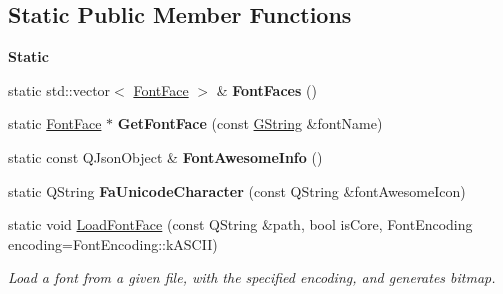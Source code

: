 \subsection*{Static Public Member Functions}
\begin{Indent}\textbf{ Static}\par
\begin{DoxyCompactItemize}
\item 
\mbox{\label{classrev_1_1_font_manager_a368b940b9ad9756a10a5d0de9022c65b}} 
static std\+::vector$<$ \mbox{\hyperlink{classrev_1_1_font_face}{Font\+Face}} $>$ \& {\bfseries Font\+Faces} ()
\item 
\mbox{\label{classrev_1_1_font_manager_a8752a2da7c737a473d25b6d7a15887e6}} 
static \mbox{\hyperlink{classrev_1_1_font_face}{Font\+Face}} $\ast$ {\bfseries Get\+Font\+Face} (const \mbox{\hyperlink{classrev_1_1_g_string}{G\+String}} \&font\+Name)
\item 
\mbox{\label{classrev_1_1_font_manager_a74da1f046298ddf7af77e0f4dc8f1d87}} 
static const Q\+Json\+Object \& {\bfseries Font\+Awesome\+Info} ()
\item 
\mbox{\label{classrev_1_1_font_manager_a9ccba052584ceb2f9acec9bb58e97f91}} 
static Q\+String {\bfseries Fa\+Unicode\+Character} (const Q\+String \&font\+Awesome\+Icon)
\item 
\mbox{\label{classrev_1_1_font_manager_a97e6e0201434a3d22ed8f05e5456a9bd}} 
static void \mbox{\hyperlink{classrev_1_1_font_manager_a97e6e0201434a3d22ed8f05e5456a9bd}{Load\+Font\+Face}} (const Q\+String \&path, bool is\+Core, Font\+Encoding encoding=Font\+Encoding\+::k\+A\+S\+C\+II)
\begin{DoxyCompactList}\small\item\em Load a font from a given file, with the specified encoding, and generates bitmap. \end{DoxyCompactList}\end{DoxyCompactItemize}
\end{Indent}
